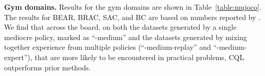 \textbf{Gym domains.} Results for the gym domains are shown in Table~\ref{table:mujoco}. The results for BEAR, BRAC, SAC, and BC are based on numbers reported by \citet{d4rl}. We find that across the board, on both the datasets generated by a single mediocre policy, marked as ``-medium'' and the datasets generated by mixing together experience from multiple policies (``-medium-replay'' and ``-medium-expert''), that are more likely to be encountered in practical problems, CQL outperforms prior methods.


